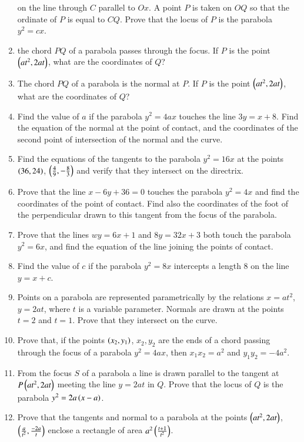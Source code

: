 \begin{enumerate}[1.]
on the line through $C$ parallel to $Ox$.  A point $P$ is taken on $OQ$ so that the ordinate
of $P$ is equal to $CQ$.  Prove that the locus of $P$ is the parabola $y^2=cx$.  
\item the chord $PQ$ of a parabola passes through the focus.  If $P$ is the point 
$\left(at^2,2at\right)$, what are the coordinates of $Q$?
\item The chord $PQ$ of a parabola is the normal at $P$.  If $P$   is the point $\left(at^2,2at\right)$,
what are the coordinates of $Q$?
\item Find the value of $a$ if the parabola $y^2=4ax$ touches the line $3y=x+8$. Find the
equation of the normal at the point of contact, and the coordinates of the second
point of intersection of the normal and the curve.
\item Find the equations of the tangents to the parabola $y^2=16x$ at the points $\left(36,24\right)$,
$\left(\frac{4}{9},-\frac{8}{3}\right)$ and verify that they intersect on the directrix.
\item Prove that the line $x-6y+36=0$ touches the parabola $y^2=4x$ and find the coordinates
of the point of contact.  Find also the coordinates of the foot of the perpendicular drawn
to this tangent from the focus of the parabola.
\item Prove that the lines $wy=6x+1$ and $8y=32x+3$  both touch the parabola $y^2=6x$,
and find the equation of the line joining the points of contact.
\item Find the value of $c$ if the parabola $y^2=8x$ intercepts a length 8  on the line
$y=x+c$.  
\item Points on a parabola are represented parametrically by the relations $x=at^2$, $y=2at$,
where $t$ is a variable parameter.  Normals are drawn at the points $t=2$ and $t=1$.  Prove that
they intersect on the curve.
\item Prove that, if the points $\left(x_2,y_1\right)$, $x_2,y_2$ are the ends of a chord passing through
the focus of a parabola $y^2=4ax$, then $x_1x_2=a^2$ and $y_1y_2=-4a^2$.  
\item From the focus $S$ of a parabola a line is drawn parallel to the tangent at $P \left(at^2,2at\right)$
meeting the line $y=2at$ in $Q$.  Prove that the locus of $Q$ is the parabola $y^2=2a\left(x-a\right)$.
\item Prove that the tangents and normal to a parabola at the points $\left(at^2,2at\right)$, $\left(\frac{a}{t^2},\frac{-2a}{t}\right)$
enclose a rectangle of area $a^2\left(\frac{t+1}{t^2}\right)$.  
\end{enumerate}
